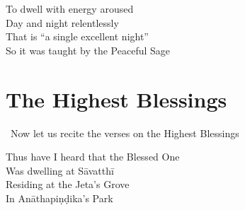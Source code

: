 \begin{english-verses}
  To dwell with energy aroused\\
  Day and night relentlessly\hyperlink{endnote44-appendix}{\hypertarget{endnote44-body}{}}\\
  That is ``a single excellent night''\hyperlink{endnote45-appendix}{\hypertarget{endnote45-body}{}}\\
  So it was taught by the Peaceful Sage
\end{english-verses}

\suttaRef{[MN 131]}


\section{The Highest Blessings}
\label{highest-blessings}

\vspace{-0.1cm}

\begin{leader-english}
  \anglebracketleft\ \hspace{-0.5mm}Now let us recite the verses on the Highest Blessings\hyperlink{endnote46-appendix}{\hypertarget{endnote46-body}{}} \hspace{-0.5mm}\anglebracketright\
\end{leader-english}

\begin{english-only}
  Thus have I heard that the Blessed One\\
  Was dwelling at Sāvatthī\hyperlink{endnote47-appendix}{\hypertarget{endnote47-body}{}}\\
  Residing at the Jeta's Grove\\
  In Anāthapiṇḍika's Park
\end{english-only}

